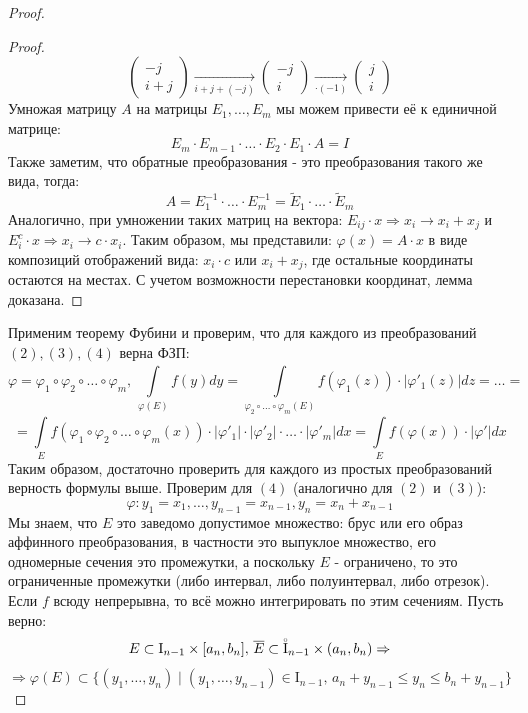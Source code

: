 \documentclass[12pt]{article}
\newcommand{\MI}{\mathrm{I}}
\theoremstyle{definition}
\newcommand{\ddint}[2]{\displaystyle\int\limits_{#1}^{#2}}
\newcommand{\wte}[1]{\widetilde{#1}}
\newcommand{\ovl}[1]{\overline{#1}}
\newcommand{\Circ}[1]{\accentset{\circ}{#1}}
\begin{document}
\begin{proof}
\begin{proof}
$$			\begin{pmatrix}
				-j\\
				i + j
			\end{pmatrix} \xrightarrow[ i+ j + (-j)]{}
			\begin{pmatrix}
				-j\\
				i
			\end{pmatrix} \xrightarrow[ \cdot (-1)]{}
			\begin{pmatrix}
				j\\
				i
			\end{pmatrix}
		$$
		Умножая матрицу $A$ на матрицы $E_1, \dotsc, E_m$ мы можем привести её к единичной матрице:
		$$
			E_m{\cdot}E_{m-1}{\cdot}\dotsc{\cdot}E_2{\cdot}E_1{\cdot}A = I
		$$
		Также заметим, что обратные преобразования - это преобразования такого же вида, тогда:
		$$
			A = E^{-1}_1{\cdot}\dotsc{\cdot}E^{-1}_m = \wte{E}_1{\cdot}\dotsc{\cdot}\wte{E}_m
		$$
		Аналогично, при умножении таких матриц на вектора: $E_{ij}{\cdot}x \Rightarrow x_i \to x_i + x_j$ и $E_i^c{\cdot}x \Rightarrow x_i \to c{\cdot}x_i$. Таким образом, мы представили: $\varphi(x) = A{\cdot}x$ в виде композиций отображений вида: $x_i{\cdot}c$ или $x_i + x_j$, где остальные координаты остаются на местах. С учетом возможности перестановки координат, лемма доказана.
	\end{proof}
	Применим теорему Фубини и проверим, что для каждого из преобразований $(2), (3), (4)$ верна ФЗП:
	$$
		\varphi = \varphi_1 \circ \varphi_2 \circ \dotsc \circ \varphi_m, \, \ddint{\varphi(E)}{}f(y)dy = \ddint{\varphi_2{\circ}\dotsc{\circ}\varphi_m(E)}{}f(\varphi_1(z)){\cdot}|\varphi'_1(z)|dz =  \dotsc = 
	$$
	$$
		= \ddint{E}{}f(\varphi_1{\circ}\varphi_2{\circ}\dotsc{\circ}\varphi_m(x)){\cdot}|\varphi'_1|{\cdot}|\varphi'_2|{\cdot}\dotsc{\cdot}|\varphi'_m|dx = \ddint{E}{}f(\varphi(x)){\cdot}|\varphi'|dx
	$$
	Таким образом, достаточно проверить для каждого из простых преобразований верность формулы выше. Проверим для $(4)$ (аналогично для $(2)$ и $(3)$):
	$$
		\varphi \colon y_1 = x_1, \dotsc, y_{n-1} = x_{n-1}, y_n = x_n + x_{n-1}
	$$
	Мы знаем, что $E$ это заведомо допустимое множество: брус или его образ аффинного преобразования, в частности это выпуклое множество, его одномерные сечения это промежутки, а поскольку $E$ - ограничено, то это ограниченные промежутки (либо интервал, либо полуинтервал, либо отрезок). Если $f$ всюду непрерывна, то всё можно интегрировать по этим сечениям. Пусть верно:
	$$
		E \subset \MI_{n-1}\times [a_n,b_n], \, \ovl{E} \subset \Circ{\MI}_{n-1} \times (a_n,b_n) \Rightarrow
	$$
	$$
		\Rightarrow \varphi(E) \subset \{(y_1,\dotsc, y_n) \mid (y_1, \dotsc, y_{n-1}) \in \MI_{n-1}, \, a_n + y_{n-1} \leq y_n \leq b_n + y_{n-1}  \}
$$
\end{proof}
\end{document}
